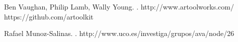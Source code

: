 \documentclass[pdflatex,11pt]{aghdpl}
\author{Ksawery Głaz}
\date{2016}
\begin{document}
\titlepages

\tableofcontents
\clearpage









% 
% 



\begin{thebibliography}{1}

Ben Vaughan, Philip Lamb, Wally Young.
.
\newblock http://www.artoolworks.com/
\newblock https://github.com/artoolkit

Rafael Munoz-Salinas.
.
\newblock http://www.uco.es/investiga/grupos/ava/node/26


\end{thebibliography}
\end{document}
